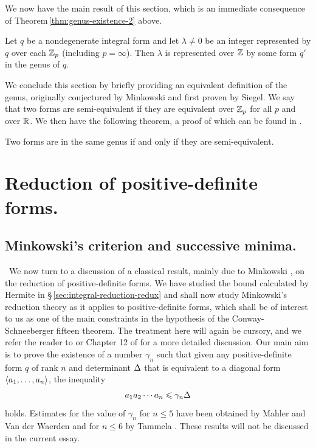 We now have the main result of this section, which is an immediate consequence
of Theorem\,\ref{thm:genus-existence-2} above.

\begin{corollary}
    Let \(q\) be a nondegenerate integral form and let \(\lambda \neq 0\) be an
    integer represented by \(q\) over each \(\mathbb{Z}_p\) (including \(p =
    \infty\)). Then \(\lambda\) is represented over \(\mathbb{Z}\) by some form
    \(q'\) in the genus of \(q\).
\end{corollary}

We conclude this section by briefly providing an equivalent definition of the
genus, originally conjectured by Minkowski and first proven by Siegel. We say
that two forms are semi-equivalent if they are equivalent over \(\mathbb{Z}_p\)
for all \(p\) and over \(\mathbb{R}\). We then have the following theorem, a proof
of which can be found in \cite[\S\,5]{siegel1941equivalence}.

\begin{theoremx}
    Two forms are in the same genus if and only if they are semi-equivalent.
\end{theoremx}

\section{Reduction of positive-definite forms.}

\subsection{Minkowski's criterion and successive minima.}~We now turn to a
discussion of a classical result, mainly due to Minkowski
\cite{schwermer2007reduction,minkowski1885untersuchungen}, on the reduction of
positive-definite forms. We have studied the bound calculated by Hermite in
\S\,\ref{sec:integral-reduction-redux} and shall now study Minkowski's reduction
theory as it applies to positive-definite forms, which shall be of interest to
us as one of the main constraints in the hypothesis of the Conway-Schneeberger
fifteen theorem. The treatment here will again be cursory, and we refer the
reader to \cite{donaldson1979minkowski} or Chapter 12 of
\cite{cassels2008rational} for a more detailed discussion. Our main aim is to
prove the existence of a number \(\gamma_n\) such that given any
positive-definite form \(q\) of rank \(n\) and determinant \({\Delta}\) that is
equivalent to a diagonal form \(\langle a_1, \dots, a_n \rangle\), the inequality
\[
    a_1 a_2 \cdots a_n \leqslant \gamma_n {\Delta}
\]
holds. Estimates for the value of \(\gamma_n\) for \(n \leq 5\) have been
obtained by Mahler \cite{mahler1938minkowski} and Van der Waerden
\cite{van1956reduktionstheorie,van1969dasminimum} and for \(n \leq 6\) by
Tammela \cite{tammela1979reduction}. These results will not be discussed in the
current essay.

